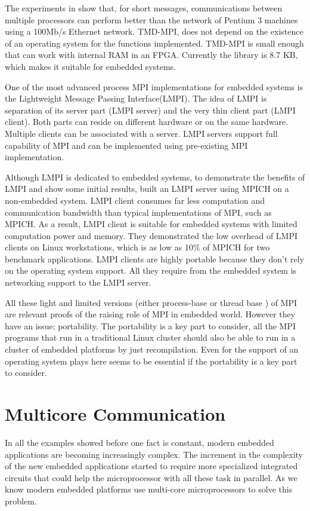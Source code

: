 The experiments in \cite{Saldana-Chow}  show that, for short messages,
communications between multiple processors can perform better than the network
of Pentium 3 machines using a 100Mb/s Ethernet network. TMD-MPI, does not
depend on the existence of an operating system for the functions implemented.
TMD-MPI is small enough that can work with internal RAM in an FPGA. Currently
the library is 8.7 KB, which makes it suitable for embedded systems.

One of the most advanced process MPI implementations for embedded
systems is the Lightweight Message Passing Interface(LMPI)\cite{Abgaria}. The
idea of LMPI is separation of its server part (LMPI server) and the very thin
client part (LMPI client). Both parts can reside on different hardware or on
the same hardware. Multiple clients can be associated with a server. LMPI
servers support full capability of MPI and can be implemented using
pre-existing MPI implementation. 

Although LMPI is dedicated to embedded systems, to demonstrate the benefits of
LMPI and show some initial results, \cite{Abgaria} built an LMPI server using
MPICH on a non-embedded system. LMPI client consumes far less computation and
communication bandwidth than typical implementations of MPI, such as MPICH.  As
a result, LMPI client is suitable for embedded systems with limited computation
power and memory. They demonstrated the low overhead of LMPI clients on Linux
workstations, which is as low as 10\% of MPICH for two benchmark applications.
LMPI clients are highly portable because they don't rely on the operating
system support. All they require from the embedded system is networking support
to the LMPI server.

All these light and limited versions (either process-base or thread base ) of
MPI are relevant proofs of the raising role of MPI in embedded world. However
they have an issue: portability. The portability is a key part to consider, all
the MPI programs that run in a traditional Linux cluster should also be able to
run in a cluster of embedded platforms  by just recompilation.  Even for
\cite{Gallego} the support of an operating system plays here seems to be
essential if the portability is a key part to consider.

\section{Multicore Communication}

In all the examples showed before one fact is constant, modern embedded
applications are becoming increasingly complex. The increment in the complexity
of the new embedded applications started to require more specialized integrated
circuits that could help the microprocessor with all these task in parallel. As
we know modern embedded platforms use multi-core microprocessors to solve this
problem.

